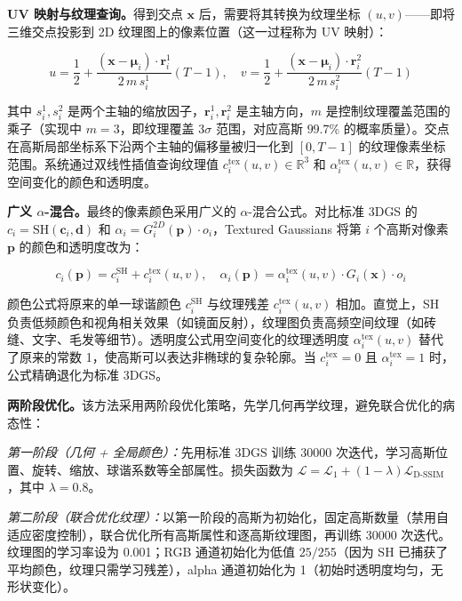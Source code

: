 \textbf{UV 映射与纹理查询。}得到交点 $\mathbf{x}$ 后，需要将其转换为纹理坐标 $(u,v)$——即将三维交点投影到 2D 纹理图上的像素位置（这一过程称为 UV 映射）：

\begin{equation}
u = \frac{1}{2} + \frac{(\mathbf{x} - \boldsymbol{\mu}_i) \cdot \mathbf{r}_i^1}{2 \, m \, s_i^1} (T-1), \quad
v = \frac{1}{2} + \frac{(\mathbf{x} - \boldsymbol{\mu}_i) \cdot \mathbf{r}_i^2}{2 \, m \, s_i^2} (T-1)
\end{equation}

其中 $s_i^1, s_i^2$ 是两个主轴的缩放因子，$\mathbf{r}_i^1, \mathbf{r}_i^2$ 是主轴方向，$m$ 是控制纹理覆盖范围的乘子（实现中 $m=3$，即纹理覆盖 $3\sigma$ 范围，对应高斯 $99.7\%$ 的概率质量）。交点在高斯局部坐标系下沿两个主轴的偏移量被归一化到 $[0, T-1]$ 的纹理像素坐标范围。系统通过双线性插值查询纹理值 $c_i^{\text{tex}}(u,v) \in \mathbb{R}^3$ 和 $\alpha_i^{\text{tex}}(u,v) \in \mathbb{R}$，获得空间变化的颜色和透明度。

\textbf{广义 $\alpha$-混合。}最终的像素颜色采用广义的 $\alpha$-混合公式。对比标准 3DGS 的 $c_i = \mathrm{SH}(\mathbf{c}_i, \mathbf{d})$ 和 $\alpha_i = G_i^{2D}(\mathbf{p}) \cdot o_i$，Textured Gaussians 将第 $i$ 个高斯对像素 $\mathbf{p}$ 的颜色和透明度改为：

\begin{equation}
c_i(\mathbf{p}) = c_i^{\text{SH}} + c_i^{\text{tex}}(u,v), \quad
\alpha_i(\mathbf{p}) = \alpha_i^{\text{tex}}(u,v) \cdot G_i(\mathbf{x}) \cdot o_i
\end{equation}

颜色公式将原来的单一球谐颜色 $c_i^{\text{SH}}$ 与纹理残差 $c_i^{\text{tex}}(u,v)$ 相加。直觉上，SH 负责低频颜色和视角相关效果（如镜面反射），纹理图负责高频空间纹理（如砖缝、文字、毛发等细节）。透明度公式用空间变化的纹理透明度 $\alpha_i^{\text{tex}}(u,v)$ 替代了原来的常数 1，使高斯可以表达非椭球的复杂轮廓。当 $c_i^{\text{tex}} = 0$ 且 $\alpha_i^{\text{tex}} = 1$ 时，公式精确退化为标准 3DGS。

\textbf{两阶段优化。}该方法采用两阶段优化策略，先学几何再学纹理，避免联合优化的病态性：

\textit{第一阶段（几何 + 全局颜色）：}先用标准 3DGS 训练 30000 次迭代，学习高斯位置、旋转、缩放、球谐系数等全部属性。损失函数为 $\mathcal{L} = \mathcal{L}_1 + (1-\lambda)\mathcal{L}_{\text{D-SSIM}}$，其中 $\lambda = 0.8$。

\textit{第二阶段（联合优化纹理）：}以第一阶段的高斯为初始化，固定高斯数量（禁用自适应密度控制），联合优化所有高斯属性和逐高斯纹理图，再训练 30000 次迭代。纹理图的学习率设为 0.001；RGB 通道初始化为低值 $25/255$（因为 SH 已捕获了平均颜色，纹理只需学习残差），alpha 通道初始化为 1（初始时透明度均匀，无形状变化）。

